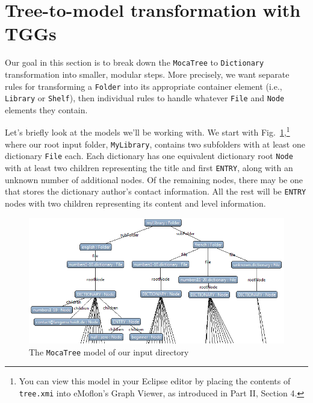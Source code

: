 \newpage
\section{Tree-to-model transformation with TGGs}
\genHeader

Our goal in this section is to break down the \texttt{MocaTree} to \texttt{Dictionary} transformation into smaller, modular steps. More precisely, we
want separate rules for transforming a \texttt{Folder} into its appropriate container element (i.e., \texttt{Library} or \texttt{Shelf}), then individual rules
to handle whatever \texttt{File} and \texttt{Node} elements they contain.

\vspace{0.5cm}

Let's briefly look at the models we'll be working with. We start with Fig.~\ref{eclipse:treeStart},\footnote{You can view this model in your Eclipse editor by
placing the contents of \texttt{tree.xmi} into eMoflon's Graph Viewer, as introduced in Part II, Section 4.} where our root input folder, \texttt{MyLibrary},
contains two subfolders with at least one dictionary \texttt{File} each. Each dictionary has one equivalent dictionary root \texttt{Node} with at least two
children representing the title and first \texttt{ENTRY}, along with an unknown number of additional nodes. Of the remaining nodes, there may be one that stores
the dictionary author's contact information. All the rest will be \texttt{ENTRY} nodes with two children representing its content and level information.

\vspace{1cm}

\begin{figure}[htbp]
\hspace{-1.5cm}
 	\includegraphics[width=1.2\textwidth]{eclipse_TreeStartMetamodel}
 	\caption{The \texttt{MocaTree} model of our input directory}
 	\label{eclipse:treeStart}
\end{figure}

